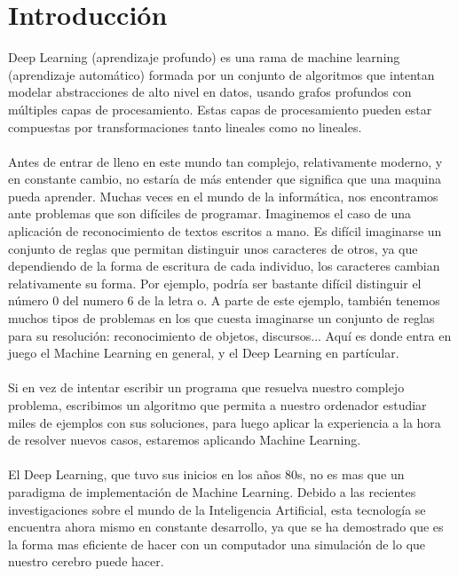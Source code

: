 \chapter{Introducción}
\label{chap:intro}

\vspace{-0.2cm}

Deep Learning (aprendizaje profundo) es una rama de machine learning (aprendizaje automático) formada por un conjunto de algoritmos que intentan modelar abstracciones de alto nivel en datos, usando grafos profundos con múltiples capas de procesamiento. Estas capas de procesamiento pueden estar compuestas por transformaciones tanto lineales como no lineales.\\\\
Antes de entrar de lleno en este mundo tan complejo, relativamente moderno, y en constante cambio, no estaría de más entender que significa que una maquina pueda aprender. Muchas veces en el mundo de la informática, nos encontramos ante problemas que son difíciles de programar. Imaginemos el caso de una aplicación de reconocimiento de textos escritos a mano. Es difícil imaginarse un conjunto de reglas que permitan distinguir unos caracteres de otros, ya que dependiendo de la forma de escritura de cada individuo, los caracteres cambian relativamente su forma. Por ejemplo, podría ser bastante difícil distinguir el número 0 del numero 6 de la letra o. A parte de este ejemplo, también tenemos muchos tipos de problemas en los que cuesta imaginarse un conjunto de reglas para su resolución: reconocimiento de objetos, discursos... Aquí es donde entra en juego el Machine Learning en general, y el Deep Learning en partícular.\\\\
Si en vez de intentar escribir un programa que resuelva nuestro complejo problema, escribimos un algoritmo que permita a nuestro ordenador estudiar miles de ejemplos con sus soluciones, para luego aplicar la experiencia a la hora de resolver nuevos casos, estaremos aplicando Machine Learning.\\\\
El Deep Learning, que tuvo sus inicios en los años 80s, no es mas que un paradigma de implementación de Machine Learning. Debido a las recientes investigaciones sobre el mundo de la Inteligencia Artificial, esta tecnología se encuentra ahora mismo en constante desarrollo, ya que se ha demostrado que es la forma mas eficiente de hacer con un computador una simulación de lo que nuestro cerebro puede hacer.

